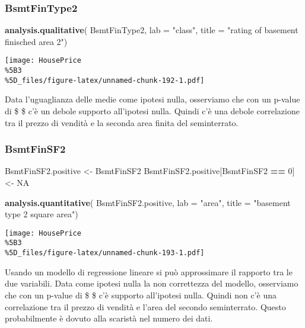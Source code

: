 \documentclass[
]{article}
\newenvironment{Shaded}{\begin{snugshade}}{\end{snugshade}}
\newcommand{\AttributeTok}[1]{\textcolor[rgb]{0.13,0.29,0.53}{#1}}
\newcommand{\ConstantTok}[1]{\textcolor[rgb]{0.56,0.35,0.01}{#1}}
\newcommand{\DecValTok}[1]{\textcolor[rgb]{0.00,0.00,0.81}{#1}}
\newcommand{\FunctionTok}[1]{\textcolor[rgb]{0.13,0.29,0.53}{\textbf{#1}}}
\newcommand{\NormalTok}[1]{#1}
\newcommand{\OtherTok}[1]{\textcolor[rgb]{0.56,0.35,0.01}{#1}}
\newcommand{\SpecialCharTok}[1]{\textcolor[rgb]{0.81,0.36,0.00}{\textbf{#1}}}
\newcommand{\StringTok}[1]{\textcolor[rgb]{0.31,0.60,0.02}{#1}}
\begin{document}
\subsubsection{BsmtFinType2}\label{bsmtfintype2-1}

\begin{Shaded}
\begin{Highlighting}[]
\FunctionTok{analysis.qualitative}\NormalTok{(}
\NormalTok{    BsmtFinType2,}
    \AttributeTok{lab =} \StringTok{"class"}\NormalTok{,}
    \AttributeTok{title =} \StringTok{"rating of basement finisched area 2"}\NormalTok{)}
\end{Highlighting}
\end{Shaded}

\texttt{[image: HousePrice\\\%5B3\\\%5D\_files/figure-latex/unnamed-chunk-192-1.pdf]}

Data l'uguaglianza delle medie come ipotesi nulla, osserviamo che con un
p-value di \$  \$ c'è un debole supporto all'ipotesi nulla.
Quindi c'è una debole correlazione tra il prezzo di vendità e la seconda
area finita del seminterrato.

\subsubsection{BsmtFinSF2}\label{bsmtfinsf2-1}

\begin{Shaded}
\begin{Highlighting}[]
\NormalTok{BsmtFinSF2.positive }\OtherTok{\textless{}{-}}\NormalTok{ BsmtFinSF2}
\NormalTok{BsmtFinSF2.positive[BsmtFinSF2 }\SpecialCharTok{==} \DecValTok{0}\NormalTok{] }\OtherTok{\textless{}{-}} \ConstantTok{NA}

\FunctionTok{analysis.quantitative}\NormalTok{(}
\NormalTok{    BsmtFinSF2.positive,}
    \AttributeTok{lab =} \StringTok{"area"}\NormalTok{,}
    \AttributeTok{title =} \StringTok{"basement type 2 square area"}\NormalTok{)}
\end{Highlighting}
\end{Shaded}

\texttt{[image: HousePrice\\\%5B3\\\%5D\_files/figure-latex/unnamed-chunk-193-1.pdf]}

Usando un modello di regressione lineare si può approssimare il rapporto
tra le due variabili. Data come ipotesi nulla la non correttezza del
modello, osserviamo che con un p-value di \$  \$ c'è
supporto all'ipotesi nulla. Quindi non c'è una correlazione tra il
prezzo di vendità e l'area del secondo seminterrato. Questo
probabilmente è dovuto alla scaristà nel numero dei dati.
\end{document}
